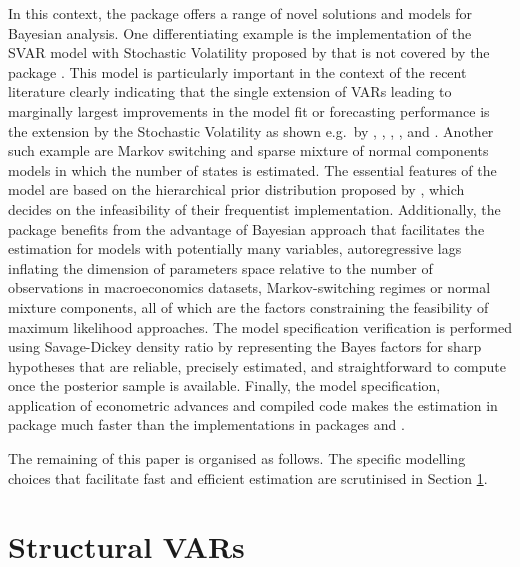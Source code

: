 \documentclass[
  nojss]{jss}
\begin{document}
In this context, the  package offers a range of novel
solutions and models for Bayesian analysis. One differentiating example
is the implementation of the SVAR model with Stochastic Volatility
proposed by \cite{LSUW2022} that is not covered by the package
. This model is particularly important in the context of the
recent literature clearly indicating that the single extension of VARs
leading to marginally largest improvements in the model fit or
forecasting performance is the extension by the Stochastic Volatility as
shown e.g.~by \cite{Clark2015}, \cite{Chan2018},
\cite{carriero_large_2019}, \cite{chan2020large}, and
\cite{bertsche2022identification}. Another such example are Markov
switching and sparse mixture of normal components models in which the
number of states is estimated. The essential features of the model are
based on the hierarchical prior distribution proposed by
\cite{malsiner2016model}, which decides on the infeasibility of their
frequentist implementation. Additionally, the package 
benefits from the advantage of Bayesian approach that facilitates the
estimation for models with potentially many variables, autoregressive
lags inflating the dimension of parameters space relative to the number
of observations in macroeconomics datasets, Markov-switching regimes or
normal mixture components, all of which are the factors constraining the
feasibility of maximum likelihood approaches. The model specification
verification is performed using Savage-Dickey density ratio by
\cite{Verdinelli1995} representing the Bayes factors for sharp
hypotheses that are reliable, precisely estimated, and straightforward
to compute once the posterior sample is available. Finally, the model
specification, application of econometric advances and compiled code
makes the estimation in package  much faster than the
implementations in packages  and .

The remaining of this paper is organised as follows. The specific
modelling choices that facilitate fast and efficient estimation are
scrutinised in Section \ref{sec:svars}.

\section{Structural VARs}\label{sec:svars}
\end{document}
